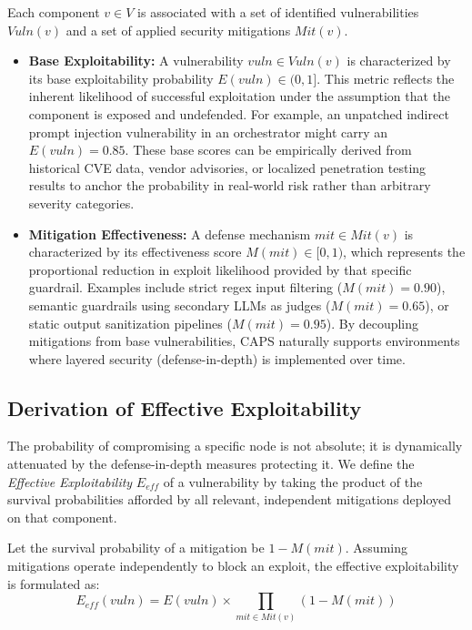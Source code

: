 Each component $v \in V$ is associated with a set of identified vulnerabilities $Vuln(v)$ and a set of applied security mitigations $Mit(v)$. 
\begin{itemize}
    \item \textbf{Base Exploitability:} A vulnerability $vuln \in Vuln(v)$ is characterized by its base exploitability probability $E(vuln) \in (0, 1]$. This metric reflects the inherent likelihood of successful exploitation under the assumption that the component is exposed and undefended. For example, an unpatched indirect prompt injection vulnerability in an orchestrator might carry an $E(vuln) = 0.85$. These base scores can be empirically derived from historical CVE data, vendor advisories, or localized penetration testing results to anchor the probability in real-world risk rather than arbitrary severity categories.
    \item \textbf{Mitigation Effectiveness:} A defense mechanism $mit \in Mit(v)$ is characterized by its effectiveness score $M(mit) \in [0, 1)$, which represents the proportional reduction in exploit likelihood provided by that specific guardrail. Examples include strict regex input filtering ($M(mit) = 0.90$), semantic guardrails using secondary LLMs as judges ($M(mit) = 0.65$), or static output sanitization pipelines ($M(mit) = 0.95$). By decoupling mitigations from base vulnerabilities, CAPS naturally supports environments where layered security (defense-in-depth) is implemented over time.
\end{itemize}

\subsection{Derivation of Effective Exploitability}
The probability of compromising a specific node is not absolute; it is dynamically attenuated by the defense-in-depth measures protecting it. We define the \textit{Effective Exploitability} $E_{eff}$ of a vulnerability by taking the product of the survival probabilities afforded by all relevant, independent mitigations deployed on that component. 

Let the survival probability of a mitigation be $1 - M(mit)$. Assuming mitigations operate independently to block an exploit, the effective exploitability is formulated as:
\begin{equation}
E_{eff}(vuln) = E(vuln) \times \prod_{mit \in Mit(v)} \left(1 - M(mit)\right)
\end{equation}

